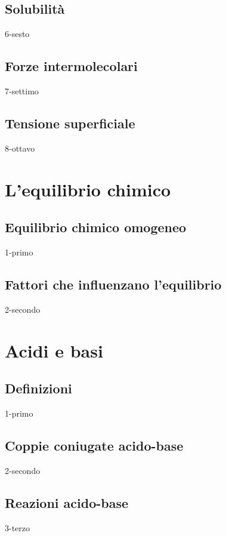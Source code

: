 \documentclass[openany,12pt]{book}%
\begin{document}
\section{Solubilità}
{6-sesto}

\section{Forze intermolecolari}
{7-settimo}

\section{Tensione superficiale}
{8-ottavo}

\chapter{L'equilibrio chimico}

\section{Equilibrio chimico omogeneo}
{1-primo}

\section{Fattori che influenzano l'equilibrio}
{2-secondo}
\chapter{Acidi e basi}

\section{Definizioni}
{1-primo}

\section{Coppie coniugate acido-base}
{2-secondo}

\section{Reazioni acido-base}
{3-terzo}
\end{document}
